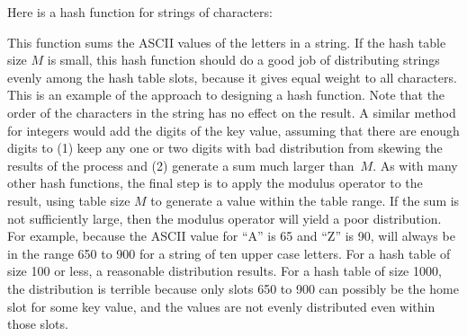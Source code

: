 \begin{example}
Here is a hash function for strings of characters:


This function sums the ASCII values of the letters in a string.
If the hash table size \(M\) is small, this hash function should do a
good job of distributing strings evenly among the hash table slots,
because it gives equal weight to all characters.
This is an example of the  approach to designing a hash
function.
Note that the order of the characters in the string has no effect on
the result.
A similar method for integers would add the digits of the key
value, assuming that there are enough digits to
(1) keep any one or two digits with bad distribution from skewing the
results of the process and
(2) generate a sum much larger than~\(M\).
As with many other hash functions, the final step is to apply the
modulus operator to the result, using table size \(M\) to generate a
value within the table range.
If the sum is not sufficiently large, then the modulus operator will
yield a poor distribution.
For example, because the ASCII value for ``A'' is 65 and ``Z'' is 90,
 will always be in the
range 650 to 900 for a string of ten upper case letters.
For a hash table of size 100 or less, a reasonable  distribution
results.
For a hash table of size 1000, the distribution is terrible because
only slots 650 to 900 can possibly be the home slot for some key
value, and the values are not evenly distributed even within those
slots.
\end{example}

